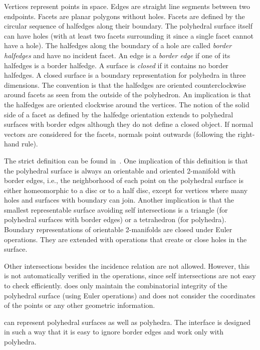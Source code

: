 Vertices represent points in space. Edges are straight line segments
between two endpoints. Facets are planar polygons without
holes. Facets are defined by the circular sequence of halfedges along
their boundary.  The polyhedral surface itself can have holes (with at
least two facets surrounding it since a single facet cannot have a
hole). The halfedges along the boundary of a hole are called {\em
border halfedges\/} and have no incident facet. An edge is a {\em
border edge\/} if one of its halfedges is a border halfedge.  A
surface is {\em closed\/} if it contains no border halfedges. A closed
surface is a boundary representation for polyhedra in three
dimensions. The convention is that the halfedges are oriented
counterclockwise around facets as seen from the outside of the
polyhedron. An implication is that the halfedges are oriented
clockwise around the vertices. The notion of the solid side of a facet
as defined by the halfedge orientation extends to polyhedral surfaces
with border edges although they do not define a closed object. If
normal vectors are considered for the facets, normals point outwards
(following the right-hand rule).

The strict definition can be found in~\cite{k-ugpdd-99}. One
implication of this definition is that the polyhedral surface is
always an orientable and oriented 2-manifold with border edges, i.e.,
the neighborhood of each point on the polyhedral surface is either
homeomorphic to a disc or to a half disc, except for vertices where
many holes and surfaces with boundary can join. Another implication is
that the smallest representable surface avoiding self intersections is
a triangle (for polyhedral surfaces with border edges) or a
tetrahedron (for polyhedra). Boundary representations of orientable
2-manifolds are closed under Euler operations. They are extended with
operations that create or close holes in the surface.

Other intersections besides the incidence relation are not allowed.
However, this is not automatically verified in the operations, since
self intersections are not easy to check
efficiently.  does only
maintain the combinatorial integrity of the polyhedral surface (using
Euler operations) and does not consider the coordinates of the points
or any other geometric information.

 can represent polyhedral
surfaces as well as polyhedra. The interface is designed in such a way
that it is easy to ignore border edges and work only with polyhedra.


